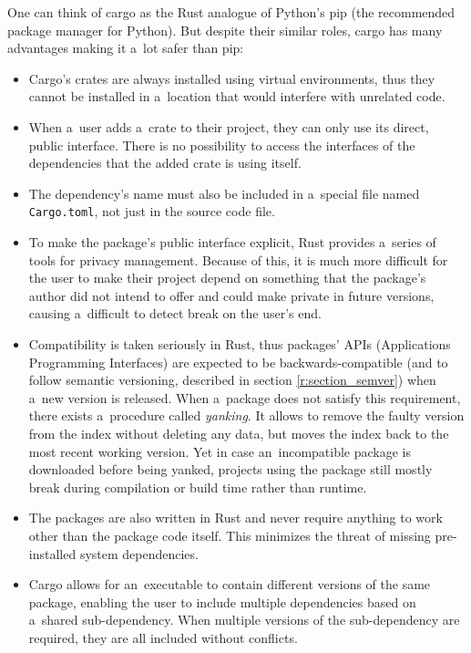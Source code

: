\documentclass[licencjacka,en]{pracamgr}
\begin{document}
One can think of cargo as the Rust analogue of Python's pip (the recommended package manager for
Python). But despite their similar roles,
cargo has many advantages making it a~lot safer than pip:
\begin{itemize}
	\item Cargo's crates are always installed using virtual environments, thus they cannot be
		installed in a~location that would interfere with unrelated code.
	\item When a~user adds a~crate to their project, they can only use its direct, public interface.
		There is no possibility to access the interfaces of the dependencies that the added crate
		is using itself.
	\item The dependency's name must also be included in a~special file named \texttt{Cargo.toml},
		not just in the source code file.
	\item To make the package's public interface explicit, Rust provides a~series of tools for
		privacy management. Because of this, it is much more difficult for the user to make their
		project depend on something that the package's author did not intend to offer and could
		make private in future versions, causing a~difficult to detect break on the user's end.
	\item Compatibility is taken seriously in Rust, thus packages' APIs (Applications Programming
		Interfaces) are expected to be backwards-compatible (and to follow semantic versioning,
		described in section \ref{r:section_semver}) when a~new version is released. When a~package
		does not satisfy this requirement, there exists a~procedure called \textit{yanking}.
		It allows to remove the faulty version from the index without deleting any data, but moves
		the index back to the most recent working version. Yet in case an~incompatible package is
		downloaded before being yanked, projects using the package still mostly break during
		compilation or build time rather than runtime.
	\item The packages are also written in Rust and never require anything to work other than the
		package code itself. This minimizes the threat of missing pre-installed
		system dependencies.
	\item Cargo allows for an~executable to contain different versions of the same package,
		enabling the user to include multiple dependencies based on a~shared sub-dependency.
		When multiple versions of the sub-dependency are required, they are all included
		without conflicts.
\end{itemize}
\end{document}

